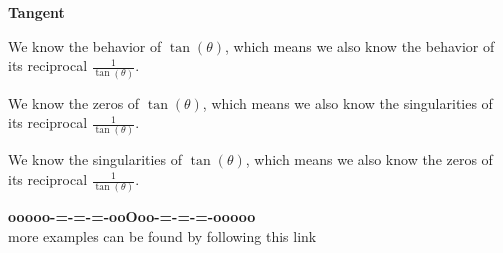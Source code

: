 \documentclass{ximera}
\begin{document}
\textbf{\textcolor{purple!80!black}{Tangent}} 

We know the behavior of $\tan(\theta)$, which means we also know the behavior of its reciprocal $\frac{1}{\tan(\theta)}$. 


We know the zeros of $\tan(\theta)$, which means we also know the singularities of its reciprocal $\frac{1}{\tan(\theta)}$. 





We know the singularities of $\tan(\theta)$, which means we also know the zeros of its reciprocal $\frac{1}{\tan(\theta)}$. 










\begin{onlineOnly}
\begin{center}
\textbf{\textcolor{green!50!black}{ooooo-=-=-=-ooOoo-=-=-=-ooooo}} \\

more examples can be found by following this link\\ 

\end{center}
\end{onlineOnly}
\end{document}
